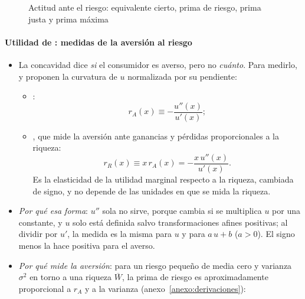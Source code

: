 \documentclass[11pt]{article}
\begin{document}
\begin{figure}[H]
\centering
\caption{Actitud ante el riesgo: equivalente cierto, prima de riesgo, prima justa y prima máxima}\label{fig:actitud-riesgo}
\end{figure}

\paragraph{Utilidad de : medidas de la aversión al riesgo}

\begin{itemize}
\item La concavidad dice \emph{si} el consumidor es averso, pero no \emph{cuánto}. Para medirlo, \textcite{Pratt1964Risk} y \textcite{Arrow1965Aspects} proponen la curvatura de $u$ normalizada por su pendiente:
  \begin{itemize}
  \item {}:
    \begin{equation}\label{eq:aversion-absoluta}
    r_A(x)\equiv-\frac{u''(x)}{u'(x)} ;
    \end{equation}
  \item {}, que mide la aversión ante ganancias y pérdidas proporcionales a la riqueza:
    \begin{equation}\label{eq:aversion-relativa}
    r_R(x)\equiv x\,r_A(x)=-\frac{x\,u''(x)}{u'(x)} .
    \end{equation}
    Es la elasticidad de la utilidad marginal respecto a la riqueza, cambiada de signo, y no depende de las unidades en que se mida la riqueza.
  \end{itemize}
\item \emph{Por qué esa forma}: $u''$ sola no sirve, porque cambia si se multiplica $u$ por una constante, y $u$ solo está definida salvo transformaciones afines positivas; al dividir por $u'$, la medida es la misma para $u$ y para $a\,u+b$ ($a>0$). El signo menos la hace positiva para el averso.
\item \emph{Por qué mide la aversión}: para un riesgo pequeño de media cero y varianza $\sigma^2$ en torno a una riqueza $\overline{W}$, la prima de riesgo es aproximadamente proporcional a $r_A$ y a la varianza (anexo~\ref{anexo:derivaciones}):
  \begin{equation}\label{eq:arrow-pratt}

\end{equation}
\end{itemize}
\end{document}
